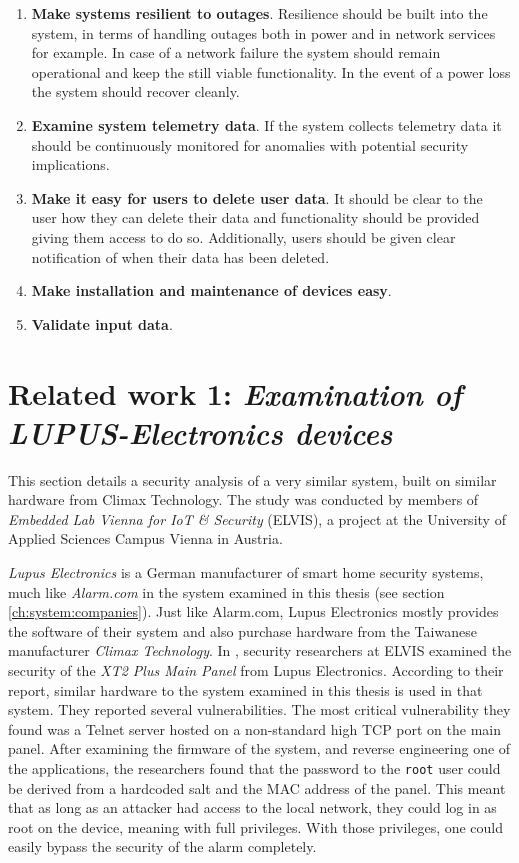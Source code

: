 \begin{enumerate}
    \item \textbf{Make systems resilient to outages}. Resilience should be built into the system, in terms of handling outages both in power and in network services for example. In case of a network failure the system should remain operational and keep the still viable functionality. In the event of a power loss the system should recover cleanly.
    
    \item \textbf{Examine system telemetry data}. If the system collects telemetry data it should be continuously monitored for anomalies with potential security implications.
    
    \item \textbf{Make it easy for users to delete user data}. It should be clear to the user how they can delete their data and functionality should be provided giving them access to do so. Additionally, users should be given clear notification of when their data has been deleted.
    
    \item \textbf{Make installation and maintenance of devices easy}.
    
    \item \textbf{Validate input data}.
\end{enumerate}


\section{Related work 1: \textit{Examination of LUPUS-Electronics devices}} \label{ch:related-work:lupus}
This section details a security analysis of a very similar system, built on similar hardware from Climax Technology. The study was conducted by members of \textit{Embedded Lab Vienna for IoT \& Security} (ELVIS), a project at the University of Applied Sciences Campus Vienna in Austria.

\textit{Lupus Electronics} is a German manufacturer of smart home security systems, much like \textit{Alarm.com} in the system examined in this thesis (see section \ref{ch:system:companies}). Just like Alarm.com, Lupus Electronics mostly provides the software of their system and also purchase hardware from the Taiwanese manufacturer \textit{Climax Technology}. In \citeyear{labvienna}, security researchers at ELVIS examined the security of the \textit{XT2 Plus Main Panel} from Lupus Electronics. According to their report, similar hardware to the system examined in this thesis is used in that system. They reported several vulnerabilities. The most critical vulnerability they found was a Telnet server hosted on a non-standard high TCP port on the main panel. After examining the firmware of the system, and reverse engineering one of the applications, the researchers found that the password to the \texttt{root} user could be derived from a hardcoded salt and the MAC address of the panel. This meant that as long as an attacker had access to the local network, they could log in as root on the device, meaning with full privileges. With those privileges, one could easily bypass the security of the alarm completely.

